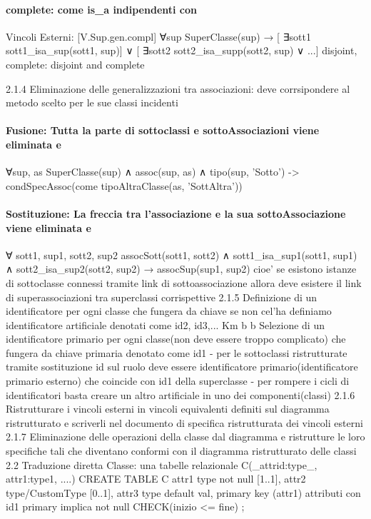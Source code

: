 \documentclass[12pt]{article}
\begin{document}
\paragraph{{complete}: come is_a indipendenti con}
						Vincoli Esterni: [V.Sup.gen.compl]
							∀sup SuperClasse(sup) → [ ∃sott1 sott1_isa_sup(sott1, sup)] ∨ [ ∃sott2 sott2_isa_supp(sott2, sup) ∨ ...]
					{disjoint, complete}: {disjoint} and {complete}

		2.1.4 Eliminazione delle generalizzazioni tra associazioni: deve corrsipondere al metodo scelto per le sue classi incidenti
\paragraph{Fusione: Tutta la parte di sottoclassi e sottoAssociazioni viene eliminata e}
				∀sup, as SuperClasse(sup) ∧ assoc(sup, as) ∧ tipo(sup, 'Sotto') -> condSpecAssoc(come tipoAltraClasse(as, 'SottAltra'))
\paragraph{Sostituzione: La freccia tra l'associazione e la sua sottoAssociazione viene eliminata e}
			∀ sott1, sup1, sott2, sup2  assocSott(sott1, sott2) ∧ sott1_isa_sup1(sott1, sup1) ∧ sott2_isa_sup2(sott2, sup2) → assocSup(sup1, sup2) cioe' se esistono istanze di sottoclasse connessi 			 	 tramite link di sottoassociazione allora deve esistere il link di superassociazioni tra superclassi corrispettive	
		2.1.5 Definizione di un identificatore per ogni classe che fungera da chiave se non cel'ha definiamo identificatore artificiale denotati come {id2}, {id3},... Km b b
			Selezione di un identificatore primario per ogni classe(non deve essere troppo complicato) che fungera da chiave primaria denotato come {id1}
				- per le sottoclassi ristrutturate tramite sostituzione {id} sul ruolo deve essere identificatore primario(identificatore primario esterno) che coincide con {id1} della 					superclasse
				- per rompere i cicli di identificatori basta creare un altro artificiale in uno dei componenti(classi)
		2.1.6 Ristrutturare i vincoli esterni in vincoli equivalenti definiti sul diagramma ristrutturato e scriverli nel documento di specifica ristrutturata dei vincoli esterni
		2.1.7 Eliminazione delle operazioni della classe dal diagramma e ristrutture le loro specifiche tali che diventano conformi con il diagramma ristrutturato delle classi
	2.2 Traduzione diretta
		Classe: una tabelle relazionale
			C(_attr{id}:type_, attr1:type1, ....)
			CREATE TABLE C{
				attr1 type not null [1..1],
				attr2 type/CustomType [0..1],
				attr3 type default val, 
				primary key (attr1) attributi con {id1}     primary implica not null
				CHECK(inizio <= fine)
			};
\end{document}
